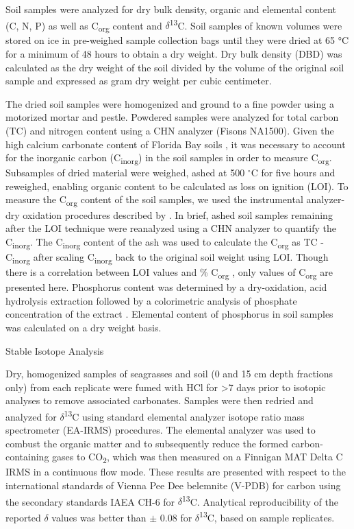 Soil samples were analyzed for dry bulk density, organic and elemental content (C, N, P) as well as C\textsubscript{org} content and $\delta$\textsuperscript{13}C. Soil samples of known volumes were stored on ice in pre-weighed sample collection bags until they were dried at 65 °C for a minimum of 48 hours to obtain a dry weight. Dry bulk density (DBD) was calculated as the dry weight of the soil divided by the volume of the original soil sample and expressed as gram dry weight per cubic centimeter.

The dried soil samples were homogenized and ground to a fine powder using a motorized mortar and pestle. Powdered samples were analyzed for total carbon (TC) and nitrogen content using a CHN analyzer (Fisons NA1500). Given the high calcium carbonate content of Florida Bay soils \citep{Bosence:1989wi}, it was necessary to account for the inorganic carbon (C\textsubscript{inorg}) in the soil samples in order to measure C\textsubscript{org}. Subsamples of dried material were weighed, ashed at 500 $^{\circ}$C for five hours and reweighed, enabling organic content to be calculated as loss on ignition (LOI). To measure the C\textsubscript{org} content of the soil samples, we used the instrumental analyzer-dry oxidation procedures described by \citet{Fourqurean:2012hu}. In brief, ashed soil samples remaining after the LOI technique were reanalyzed using a CHN analyzer to quantify the C\textsubscript{inorg}. The C\textsubscript{inorg} content of the ash was used to calculate the C\textsubscript{org} as TC - C\textsubscript{inorg} after scaling C\textsubscript{inorg} back to the original soil weight using LOI. Though there is a correlation between LOI values and \% C\textsubscript{org} \citep{Fourqurean:2012cv}, only values of C\textsubscript{org} are presented here. Phosphorus content was determined by a dry-oxidation, acid hydrolysis extraction followed by a colorimetric analysis of phosphate concentration of the extract \citep{Fourqurean:1992we}. Elemental content of phosphorus in soil samples was calculated on a dry weight basis.

\newpage

\noindent Stable Isotope Analysis
\medskip


	Dry, homogenized samples of seagrasses and soil (0 and 15 cm depth fractions only) from each replicate were fumed with HCl for >7 days prior to isotopic analyses to remove associated carbonates. Samples were then redried and analyzed for $\delta$\textsuperscript{13}C using standard elemental analyzer isotope ratio mass spectrometer (EA-IRMS) procedures. The elemental analyzer was used to combust the organic matter and to subsequently reduce the formed carbon-containing gases to CO\textsubscript{2}, which was then measured on a Finnigan MAT Delta C IRMS in a continuous flow mode. These results are presented with respect to the international standards of Vienna Pee Dee belemnite (V-PDB) for carbon using the secondary standards IAEA CH-6 for $\delta$\textsuperscript{13}C. Analytical reproducibility of the reported $\delta$ values was better than $\pm$ 0.08 for $\delta$\textsuperscript{13}C, based on sample replicates.

